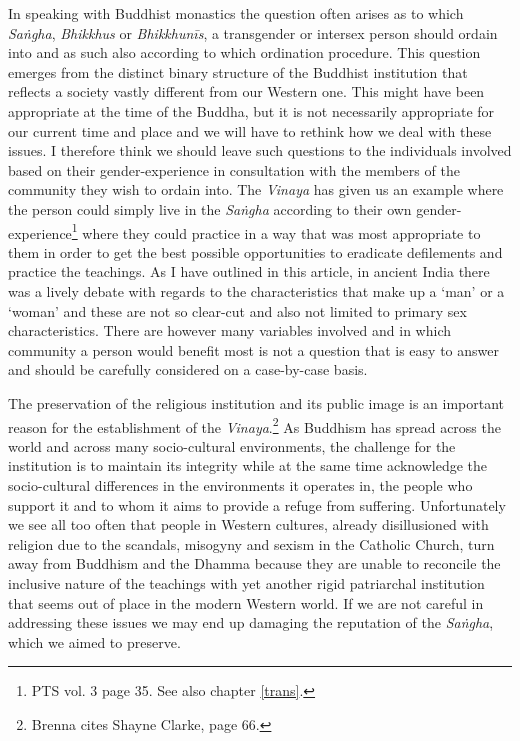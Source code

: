 In speaking with Buddhist monastics the question often arises as to which \textit{Saṅgha}, \textit{Bhikkhus} or \textit{Bhikkhunīs}, a transgender or intersex person should ordain into and as such also according to which ordination procedure. This question emerges from the distinct binary structure of the Buddhist institution that reflects a society vastly different from our Western one. This might have been appropriate at the time of the Buddha, but it is not necessarily appropriate for our current time and place and we will have to rethink how we deal with these issues. I therefore think we should leave such questions to the individuals involved based on their gender-experience in consultation with the members of the community they wish to ordain into. The \textit{Vinaya} has given us an example where the person could simply live in the \textit{Saṅgha} according to their own gender-experience\footnote{PTS vol. 3 page 35. See also chapter \ref{trans}.} where they could practice in a way that was most appropriate to them in order to get the best possible opportunities to eradicate defilements and practice the teachings. As I have outlined in this article, in ancient India there was a lively debate with regards to the characteristics that make up a `man' or a `woman' and these are not so clear-cut and also not limited to primary sex characteristics. There are however many variables involved and in which community a person would benefit most is not a question that is easy to answer and should be carefully considered on a case-by-case basis. 

The preservation of the religious institution and its public image is an important reason for the establishment of the \textit{Vinaya}.\footnote{Brenna \cite{artinger} cites Shayne Clarke, page 66.} As Buddhism has spread across the world and across many socio-cultural environments, the challenge for the institution is to maintain its integrity while at the same time acknowledge the socio-cultural differences in the environments it operates in, the people who support it and to whom it aims to provide a refuge from suffering. Unfortunately we see all too often that people in Western cultures, already disillusioned with religion due to the scandals, misogyny and sexism in the Catholic Church, turn away from Buddhism and the Dhamma because they are unable to reconcile the inclusive nature of the teachings with yet another rigid patriarchal institution that seems out of place in the modern Western world. If we are not careful in addressing these issues we may end up damaging the reputation of the \textit{Saṅgha}, which we aimed to preserve.

